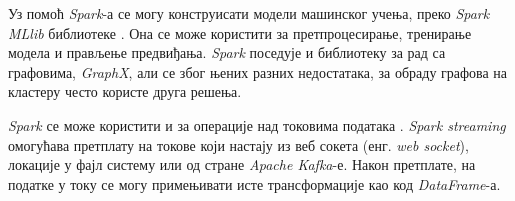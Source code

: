 \documentclass[12pt,oneside]{memoir}
\begin{document}
Уз помоћ \textit{Spark}-а се могу конструисати модели машинског учења, преко \textit{Spark MLlib} библиотеке \cite{spark_guide}. Она се може користити за претпроцесирање, тренирање модела и прављење предвиђања. \textit{Spark} поседује и библиотеку за рад са графовима, \textit{GraphX}, али се због њених разних недостатака, за обраду графова на кластеру често користе друга решења.

\textit{Spark} се може користити и за операције над токовима података \cite{spark_streaming}. \textit{Spark streaming} омогућава претплату на токове који настају из веб сокета (енг. \textit{web socket}), локације у фајл систему или од стране \textit{Apache Kafka}-е. Након претплате, на податке у току се могу примењивати исте трансформације као код \textit{DataFrame}-а.

\end{document}
